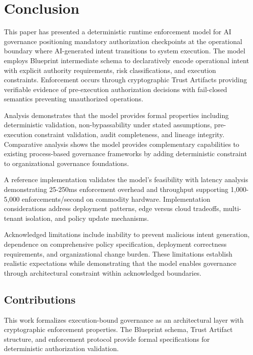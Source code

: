 \documentclass[11pt,letterpaper]{article}
\begin{document}
\section{Conclusion}
\label{sec:conclusion}

This paper has presented a deterministic runtime enforcement model for AI governance positioning mandatory authorization checkpoints at the operational boundary where AI-generated intent transitions to system execution. The model employs Blueprint intermediate schema to declaratively encode operational intent with explicit authority requirements, risk classifications, and execution constraints. Enforcement occurs through cryptographic Trust Artifacts providing verifiable evidence of pre-execution authorization decisions with fail-closed semantics preventing unauthorized operations.

Analysis demonstrates that the model provides formal properties including deterministic validation, non-bypassability under stated assumptions, pre-execution constraint validation, audit completeness, and lineage integrity. Comparative analysis shows the model provides complementary capabilities to existing process-based governance frameworks by adding deterministic constraint to organizational governance foundations.

A reference implementation validates the model's feasibility with latency analysis demonstrating 25-250ms enforcement overhead and throughput supporting 1,000-5,000 enforcements/second on commodity hardware. Implementation considerations address deployment patterns, edge versus cloud tradeoffs, multi-tenant isolation, and policy update mechanisms.

Acknowledged limitations include inability to prevent malicious intent generation, dependence on comprehensive policy specification, deployment correctness requirements, and organizational change burden. These limitations establish realistic expectations while demonstrating that the model enables governance through architectural constraint within acknowledged boundaries.

\subsection{Contributions}

This work formalizes execution-bound governance as an architectural layer with cryptographic enforcement properties. The Blueprint schema, Trust Artifact structure, and enforcement protocol provide formal specifications for deterministic authorization validation.
\end{document}
